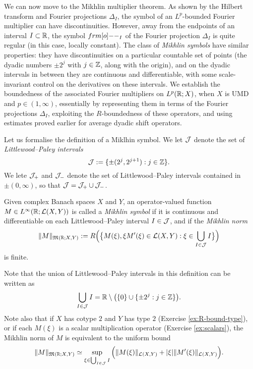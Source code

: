 We can now move to the Mikhlin multiplier theorem.
As shown by the Hilbert transform and Fourier projections $\Delta_{I}$, the symbol of an $L^p$-bounded Fourier multiplier can have discontinuities.
However, away from the endpoints of an interval $I \subset \mathbb{R}$, the symbol $\1_{I}$ of the Fourier projection $\Delta_{I}$ is quite regular (in this case, locally constant).
The class of \emph{Mikhlin symbols} have similar properties: they have discontinuities on a particular countable set of points (the dyadic numbers $\pm 2^{j}$ with $j \in \mathbb{Z}$, along with the origin), and on the dyadic intervals in between they are continuous and differentiable, with some scale-invariant control on the derivatives on these intervals.
We establish the boundedness of the associated Fourier multipliers on $L^p(\mathbb{R};X)$, when $X$ is UMD and $p \in (1,\infty)$, essentially by representing them in terms of the Fourier projections $\Delta_{I}$, exploiting the $R$-boundedness of these operators, and using estimates proved earlier for average dyadic shift operators.

Let us formalise the definition of a Miklhin symbol.
We let $\mathcal{J}$ denote the set of \emph{Littlewood--Paley intervals}
\begin{equation*}
  \mathcal{J} := \{\pm(2^{j}, 2^{j+1}) : j \in \mathbb{Z}\}.
\end{equation*}
We lete $\mathcal{J}_{+}$ and $\mathcal{J}_{-}$ denote the set of Littlewood--Paley intervals contained in $\pm(0,\infty)$, so that $\mathcal{J} = \mathcal{J}_{+} \cup \mathcal{J}_{-}$.

\begin{defn}\label{defn:mikhlin-symbol}
  Given complex Banach spaces $X$ and $Y$, an operator-valued function $M \in L^\infty(\mathbb{R}; \mathcal{L}(X,Y))$ is called a \emph{Mikhlin symbol} if it is continuous and differentiable on each Littlewood--Paley interval $I \in \mathcal{J}$, and if the \emph{Mikhlin norm}
  \begin{equation*}
    \|M\|_{\mathfrak{M}(\mathbb{R};X,Y)} := R \Big( \big\{ M(\xi), \xi M'(\xi) \in \mathcal{L}(X,Y) : \xi \in \bigcup_{I \in \mathcal{J}} I \big\} \Big)
  \end{equation*}
  is finite.
\end{defn}

Note that the union of Littlewood--Paley intervals in this definition can be written as
\begin{equation*}
  \bigcup_{I \in \mathcal{J}} I = \mathbb{R} \setminus \big( \{0\} \cup \{\pm 2^{j} : j \in \mathbb{Z}\} \big).
\end{equation*}
Note also that if $X$ has cotype $2$ and $Y$ has type $2$ (Exercise \ref{ex:R-bound-type}), or if each $M(\xi)$ is a scalar multiplication operator (Exercise \ref{ex:scalars}), the Mikhlin norm of $M$ is equivalent to the uniform bound
\begin{equation*}
  \|M\|_{\mathfrak{M}(\mathbb{R};X,Y)} \simeq \sup_{\xi \in \bigcup_{I \in \mathcal{J}} I} \Big( \|M(\xi)\|_{\mathcal{L}(X,Y)} + |\xi|\|M'(\xi)\|_{\mathcal{L}(X,Y)} \Big).
\end{equation*}

